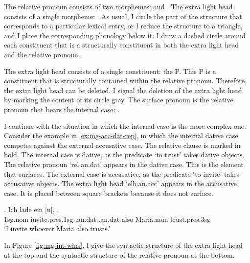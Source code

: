 The relative pronoun consists of two morphemes:  and .
The extra light head consists of a single morpheme: .
As usual, I circle the part of the structure that corresponds to a particular lexical entry, or I reduce the structure to a triangle, and I place the corresponding phonology below it.
I draw a dashed circle around each constituent that is a structurally constituent in both the extra light head and the relative pronoun.

The extra light head consists of a single constituent: the P.
This P is a constituent that is structurally contained within the relative pronoun. Therefore, the extra light head can be deleted. I signal the deletion of the extra light head by marking the content of its circle gray.
The surface pronoun is the relative pronoun that bears the internal case: .

I continue with the situation in which the internal case is the more complex one.
Consider the example in \ref{ex:mg-acc-dat-rep}, in which the internal dative case competes against the external accusative case. The relative clause is marked in bold.
The internal case is dative, as the predicate  `to trust' takes dative objects. The relative pronoun  `\ac{rel}.\ac{an}.\ac{dat}' appears in the dative case. This is the element that surfaces.
The external case is accusative, as the predicate  `to invite' takes accusative objects. The extra light head  `\ac{elh}.\ac{an}.\ac{acc}' appears in the accusative case. It is placed between square brackets because it does not surface.

\exg. Ich {lade ein} [n],    .\\
1\ac{sg}.\ac{nom} invite.\ac{pres}.1\ac{sg}\scsub{[acc]} .\ac{an}.\ac{dat} .\ac{an}.\ac{dat} also Maria.\ac{nom} trust.\ac{pres}.3\ac{sg}\scsub{[dat]}\\
`I invite whoever Maria also trusts.' \label{ex:mg-acc-dat-rep}

In Figure \ref{fig:mg-int-wins}, I give the syntactic structure of the extra light head at the top and the syntactic structure of the relative pronoun at the bottom.

